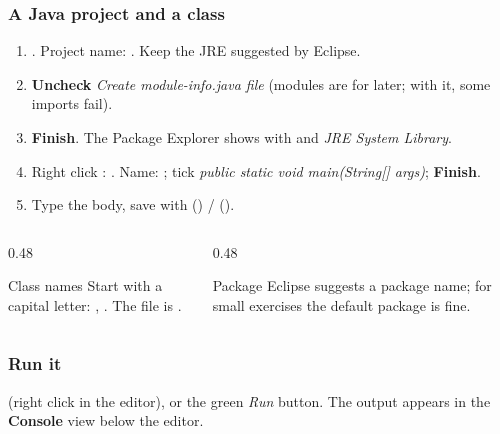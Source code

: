 \documentclass[aspectratio=169,10pt,compress]{beamer}
\begin{document}
\begin{frame}[t,fragile] \frametitle{A Java project and a class}
  \begin{enumerate}\small
    \item {}. Project name: . Keep the JRE suggested by Eclipse.
    \item \textbf{Uncheck} \emph{Create module-info.java file} (modules are for later; with it, some imports fail).
    \item \textbf{Finish}. The Package Explorer shows  with  and \emph{JRE System Library}.
    \item Right click : . Name: ; tick
          \emph{public static void main(String[] args)}; \textbf{Finish}.
    \item Type the body, save with  (\win) /  (\mac).
  \end{enumerate}
  \vspace{0.3em}
  \begin{columns}[T]
    \begin{column}{0.48\textwidth}
      \begin{block}{Class names}
        \small Start with a capital letter: , . The file is .
      \end{block}
    \end{column}
    \begin{column}{0.48\textwidth}
      \begin{block}{Package}
        \small Eclipse suggests a package name; for small exercises the default package is fine.
      \end{block}
    \end{column}
  \end{columns}
\end{frame}




\begin{frame}[t,fragile] \frametitle{Run it}

  \vspace{0.2em}
  \small {} (right click in the editor), or the green \emph{Run} button.
  The output appears in the \textbf{Console} view below the editor.
\end{frame}
\end{document}
